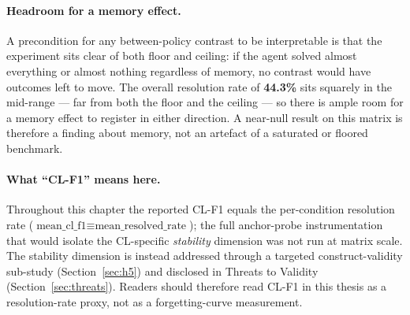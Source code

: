 \paragraph{Headroom for a memory effect.}
A precondition for any between-policy contrast to be interpretable is that the experiment
sits clear of both floor and ceiling: if the agent solved almost everything or almost
nothing regardless of memory, no contrast would have outcomes left to move. The overall
resolution rate of \textbf{44.3\%} sits squarely in the mid-range --- far from both the
floor and the ceiling --- so there is ample room for a memory effect to register in either
direction. A near-null result on this matrix is therefore a finding about memory, not an
artefact of a saturated or floored benchmark.

\paragraph{What ``CL-F1'' means here.}
Throughout this chapter the reported CL-F1 equals the per-condition resolution rate
($\text{mean\_cl\_f1} \equiv \text{mean\_resolved\_rate}$); the full anchor-probe
instrumentation that would isolate the CL-specific \emph{stability} dimension was not run
at matrix scale. The stability dimension is instead addressed through a targeted
construct-validity sub-study (Section~\ref{sec:h5}) and disclosed in Threats to Validity
(Section~\ref{sec:threats}). Readers should therefore read CL-F1 in this thesis as a
resolution-rate proxy, not as a forgetting-curve measurement.
